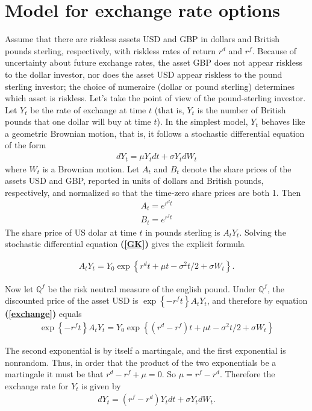 \documentclass[a4paper, 12pt]{article}
\numberwithin{equation}{subsection}
\begin{document}
\section{Model for exchange rate options}
Assume that there are riskless assets USD and GBP in dollars
and British pounds sterling, respectively, with riskless rates of return $r^d$ and $r^f$. Because of
uncertainty about future exchange rates, the asset GBP does not appear riskless
to the dollar investor, nor does the asset USD appear riskless to the pound sterling investor; the choice of numeraire (dollar or pound sterling) determines which asset is riskless. Let’s take the point of view of the pound-sterling investor. Let $Y_t$ be the rate of exchange at time $t$ (that is, $Y_t$ is the number of British pounds that one dollar will buy at time $t$). In the simplest model, $Y_t$ behaves like a geometric Brownian motion, that is, it follows a stochastic differential equation
of the form
\begin{align}
dY_t = \mu Y_t dt + \sigma Y_t dW_t \label{GK}
\end{align}
where $W_t$ is a Brownian motion. Let $A_t$ and $B_t$ denote the share prices of the assets USD
and GBP, reported in units of dollars and British pounds, respectively, and normalized so that the time-zero share prices are both 1. Then
\begin{align}
A_t = e^{r^d t}\\ 
B_t = e^{r^f t}
\end{align}
The share price of US dolar at time $t$ in pounds sterling is $A_t Y_t$. Solving the stochastic
differential equation \textbf{(\ref{GK})} gives the explicit formula

\begin{align}\label{exchange}
A_{t} Y_{t} = Y_{0} \exp \left \{ r^d t + \mu t - \sigma ^{2} t /2 + \sigma W_{t} \right \} .
\end{align}

Now let $\mathbb{Q}^f$ be the risk neutral measure of the english pound. Under $\mathbb{Q}^f$, the discounted price of the asset USD is $\exp \left \{ -r^f t \right \} A_tY_t$, and therefore by equation \textbf{(\ref{exchange})} equals 
\begin{align}
\exp \left \{ -r^f t \right \} A_tY_t = Y_0 \exp \left \{ (r^d - r^f) t + \mu t - \sigma^2 t /2 + \sigma W_t \right \}
\end{align}

The second exponential is by itself a martingale, and the first exponential is nonrandom. Thus, in order that the product of the two exponentials be a martingale it must be that $r^d - r^f + \mu = 0$. So $\mu = r^f - r^d$. Therefore the exchange rate for $Y_t$ is given by
\begin{align}
dY_t = (r^f - r^d) Y_t dt + \sigma Y_t dW_t. \label{fx}
\end{align}
\pagebreak
\end{document}
